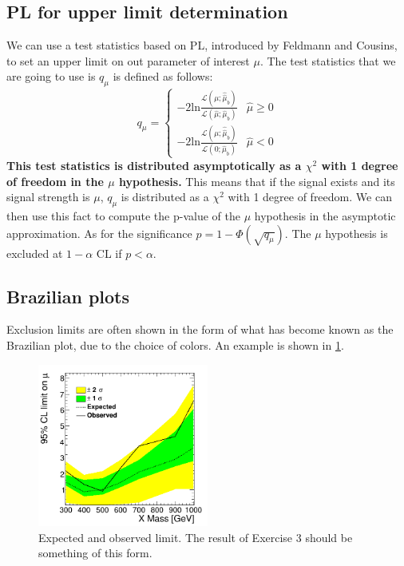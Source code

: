 \documentclass[a4paper,12pt]{article}
\begin{document}
\subsection{PL for upper limit determination}
We can use a test statistics based on PL, introduced by Feldmann and Cousins, to set an
upper limit on out parameter of interest $\mu$.
The test statistics
that we are going to use is $q_{\mu}$ is defined as follows:
\begin{equation}
q_{\mu}=\begin{cases}
-2\mathrm{ln}\frac{\mathcal{L}(\mu;\hat{\hat{\mu}}_b)}{\mathcal{L}(\hat{\mu};\hat{\mu}_b)} & \hat{\mu}\geq0 \\
-2\mathrm{ln}\frac{\mathcal{L}(\mu;\hat{\hat{\mu}}_b)}{\mathcal{L}(0;\hat{\mu}_b)} & \hat{\mu}<0
\end{cases}
\label{eq:teststat_limit}
\end{equation}
{\bf This test statistics is distributed
asymptotically as a $\chi^2$ with 1 degree of freedom in the $\mu$ hypothesis.}
This means that if the signal exists and its signal strength is $\mu$,
$q_{\mu}$ is distributed as a $\chi^2$ with 1 degree of freedom. We can then
use this fact to compute the p-value of the $\mu$ hypothesis in the asymptotic
approximation. As for the significance $p=1-\Phi(\sqrt{q_{\mu}})$. 
The $\mu$ hypothesis is excluded at $1-\alpha$ CL if $p<\alpha$.


\subsection{Brazilian plots}
Exclusion limits are often shown in the form of what has become known as the
Brazilian plot, due to the choice of colors. An example is shown in
\ref{fig:limit}. 
\begin{figure}[!b]
\centering
\includegraphics[width=0.5\textwidth]{images/limit.png}
\caption{Expected and observed limit. The result of Exercise 3 should be
something of this form.\label{fig:limit}}
\end{figure}
\end{document}

